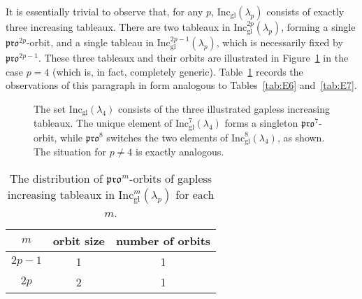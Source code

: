 \documentclass[12pt]{amsart}
\theoremstyle{definition}
\theoremstyle{remark}
\numberwithin{equation}{section}
\newcommand{\inc}{\ensuremath{\mathrm{Inc}}}
\newcommand{\incgl}{\inc_{\mathrm{gl}}}
\newcommand{\pro}{\mathfrak{pro}}
\begin{document}
It is essentially trivial to observe that, for any $p$, $\incgl(\lambda_p)$ consists of exactly three increasing tableaux. There are two tableaux in $\incgl^{2p}(\lambda_p)$, forming a single $\pro^{2p}$-orbit, and a single tableau in $\incgl^{2p-1}(\lambda_p)$, which is necessarily fixed by $\pro^{2p-1}$. These three tableaux and their orbits are illustrated in Figure~\ref{fig:propeller_orbits} in the case $p=4$ (which is, in fact, completely generic). Table~\ref{tab:prop} records the observations of this paragraph in form analogous to Tables~\ref{tab:E6} and~\ref{tab:E7}.

\begin{figure}[h]
\caption{The set $\incgl(\lambda_4)$ consists of the three illustrated gapless increasing tableaux. The unique element of $\incgl^7(\lambda_4)$ forms a singleton $\pro^7$-orbit, while $\pro^8$ switches the two elements of $\incgl^8(\lambda_4)$, as shown. The situation for $p \neq 4$ is exactly analogous.}\label{fig:propeller_orbits}
\end{figure}

\begin{table}[h]
\begin{tabular}{|c|c|c|}
\hline
$m$ & orbit size & number of orbits\\
  \hline
  $2p-1$ & 1 & 1\\
  \hline
  $2p$ & 2 & 1\\ 
  \hline
\end{tabular}
\caption{The distribution of $\pro^m$-orbits of gapless increasing tableaux in $\incgl^m(\lambda_p)$ for each $m$.}
\label{tab:prop}
\end{table}
\end{document}
